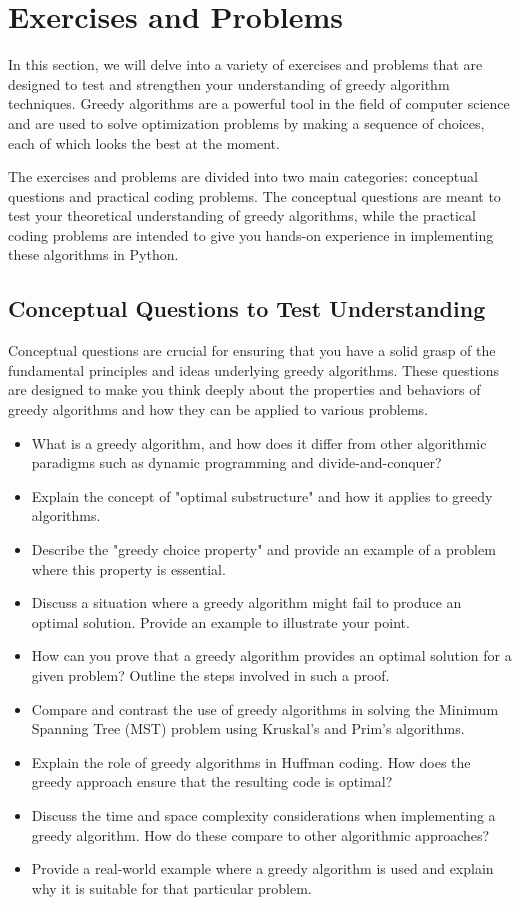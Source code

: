 \documentclass[12pt]{book} %
\begin{document}
\section{Exercises and Problems}
In this section, we will delve into a variety of exercises and problems that are designed to test and strengthen your understanding of greedy algorithm techniques. Greedy algorithms are a powerful tool in the field of computer science and are used to solve optimization problems by making a sequence of choices, each of which looks the best at the moment.

The exercises and problems are divided into two main categories: conceptual questions and practical coding problems. The conceptual questions are meant to test your theoretical understanding of greedy algorithms, while the practical coding problems are intended to give you hands-on experience in implementing these algorithms in Python.

\subsection{Conceptual Questions to Test Understanding}
Conceptual questions are crucial for ensuring that you have a solid grasp of the fundamental principles and ideas underlying greedy algorithms. These questions are designed to make you think deeply about the properties and behaviors of greedy algorithms and how they can be applied to various problems.

\begin{itemize}
    \item What is a greedy algorithm, and how does it differ from other algorithmic paradigms such as dynamic programming and divide-and-conquer?
    \item Explain the concept of "optimal substructure" and how it applies to greedy algorithms.
    \item Describe the "greedy choice property" and provide an example of a problem where this property is essential.
    \item Discuss a situation where a greedy algorithm might fail to produce an optimal solution. Provide an example to illustrate your point.
    \item How can you prove that a greedy algorithm provides an optimal solution for a given problem? Outline the steps involved in such a proof.
    \item Compare and contrast the use of greedy algorithms in solving the Minimum Spanning Tree (MST) problem using Kruskal's and Prim's algorithms.
    \item Explain the role of greedy algorithms in Huffman coding. How does the greedy approach ensure that the resulting code is optimal?
    \item Discuss the time and space complexity considerations when implementing a greedy algorithm. How do these compare to other algorithmic approaches?
    \item Provide a real-world example where a greedy algorithm is used and explain why it is suitable for that particular problem.
\end{itemize}
\end{document}
